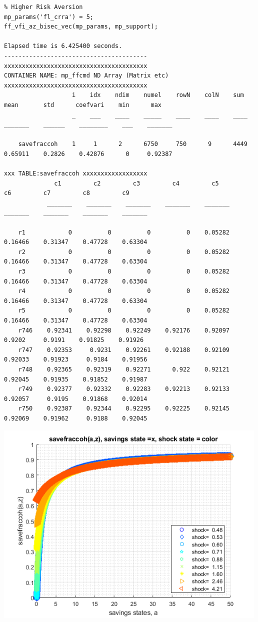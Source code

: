 \documentclass[
]{book}
\begin{document}
\begin{verbatim}
% Higher Risk Aversion
mp_params('fl_crra') = 5;
ff_vfi_az_bisec_vec(mp_params, mp_support);

Elapsed time is 6.425400 seconds.
----------------------------------------
xxxxxxxxxxxxxxxxxxxxxxxxxxxxxxxxxxxxxxxx
CONTAINER NAME: mp_ffcmd ND Array (Matrix etc)
xxxxxxxxxxxxxxxxxxxxxxxxxxxxxxxxxxxxxxxx
                   i    idx    ndim    numel    rowN    colN    sum      mean       std      coefvari    min      max  
                   _    ___    ____    _____    ____    ____    ____    _______    ______    ________    ___    _______

    savefraccoh    1     1      2      6750     750      9      4449    0.65911    0.2826    0.42876      0     0.92387

xxx TABLE:savefraccoh xxxxxxxxxxxxxxxxxx
              c1         c2         c3         c4         c5         c6         c7         c8         c9   
            _______    _______    _______    _______    _______    _______    _______    _______    _______

    r1            0          0          0          0    0.05282    0.16466    0.31347    0.47728    0.63304
    r2            0          0          0          0    0.05282    0.16466    0.31347    0.47728    0.63304
    r3            0          0          0          0    0.05282    0.16466    0.31347    0.47728    0.63304
    r4            0          0          0          0    0.05282    0.16466    0.31347    0.47728    0.63304
    r5            0          0          0          0    0.05282    0.16466    0.31347    0.47728    0.63304
    r746    0.92341    0.92298    0.92249    0.92176    0.92097     0.9202     0.9191    0.91825    0.91926
    r747    0.92353     0.9231    0.92261    0.92188    0.92109    0.92033    0.91923     0.9184    0.91956
    r748    0.92365    0.92319    0.92271      0.922    0.92121    0.92045    0.91935    0.91852    0.91987
    r749    0.92377    0.92332    0.92283    0.92213    0.92133    0.92057     0.9195    0.91868    0.92014
    r750    0.92387    0.92344    0.92295    0.92225    0.92145    0.92069    0.91962     0.9188    0.92045
\end{verbatim}

\includegraphics[width=5.20833in,height=\textheight]{img/fx_vfi_az_bisec_vec_images/figure_4.png}
\end{document}
